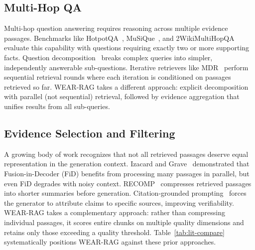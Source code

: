 \documentclass[conference]{IEEEtran}
\begin{document}
\subsection{Multi-Hop QA}
Multi-hop question answering requires reasoning across multiple evidence passages. Benchmarks like HotpotQA~\cite{yang2018hotpotqa}, MuSiQue~\cite{trivedi2022musique}, and 2WikiMultiHopQA evaluate this capability with questions requiring exactly two or more supporting facts. Question decomposition~\cite{min2019multi} breaks complex queries into simpler, independently answerable sub-questions. Iterative retrievers like MDR~\cite{xiong2021mdr} perform sequential retrieval rounds where each iteration is conditioned on passages retrieved so far. WEAR-RAG takes a different approach: explicit decomposition with parallel (not sequential) retrieval, followed by evidence aggregation that unifies results from all sub-queries.

\subsection{Evidence Selection and Filtering}
A growing body of work recognizes that not all retrieved passages deserve equal representation in the generation context. Izacard and Grave~\cite{izacard2021leveraging} demonstrated that Fusion-in-Decoder (FiD) benefits from processing many passages in parallel, but even FiD degrades with noisy context. RECOMP~\cite{xu2024recomp} compresses retrieved passages into shorter summaries before generation. Citation-grounded prompting~\cite{gao2023enabling} forces the generator to attribute claims to specific sources, improving verifiability. WEAR-RAG takes a complementary approach: rather than compressing individual passages, it scores entire chunks on multiple quality dimensions and retains only those exceeding a quality threshold. Table~\ref{tab:lit-compare} systematically positions WEAR-RAG against these prior approaches.
\end{document}
